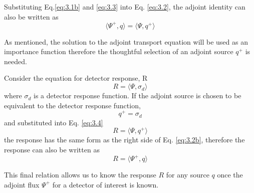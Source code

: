 Substituting Eq.\ref{eq:3.1b} and \ref{eq:3.3} into Eq. \ref{eq:3.2}, 
the adjoint identity can also be written as
\begin{equation} \label{eq:3.2b}
		\langle \Psi^{+} , q \rangle =
		\langle \Psi, q^{+} \rangle
\end{equation}

As mentioned, the solution to the adjoint transport
equation will be used as an importance function
therefore the thoughtful selection of an adjoint source $q^{+}$ is needed.

Consider the equation for detector response, R
\begin{equation} \label{eq:3.4}
		R = \langle \Psi, \sigma_{d}\rangle 
\end{equation}
where $\sigma_{d}$ is a detector response function.
If the adjoint source is chosen to be equivalent to the detector response
function,
\begin{equation} \label{eq:3.5}
		q^{+} = \sigma_{d}
\end{equation}
and substituted into Eq. \ref{eq:3.4}  
\begin{equation}
		R = \langle \Psi, q^{+} \rangle %
\end{equation}
the response has the same form as the right side of Eq. \ref{eq:3.2b}, therefore
the response can also be written as 
\begin{equation}\label{eq:resp_adj}
		R = \langle \Psi^{+}, q \rangle
\end{equation}

This final relation allows us to know the response $R$ for any source $q$ once the
adjoint flux $\Psi^{+}$ for a detector of interest is known.

